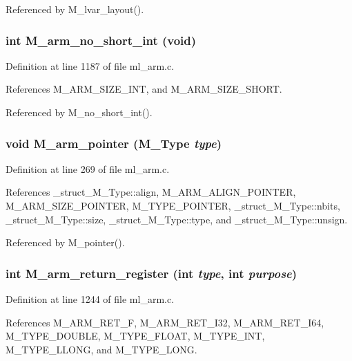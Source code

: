 Referenced by M\_\-lvar\_\-layout().
\subsubsection{\setlength{\rightskip}{0pt plus 5cm}int M\_\-arm\_\-no\_\-short\_\-int (void)}\label{m__arm_8h_3efeafb5f31e16dfb464876bcfbf3706}




Definition at line 1187 of file ml\_\-arm.c.

References M\_\-ARM\_\-SIZE\_\-INT, and M\_\-ARM\_\-SIZE\_\-SHORT.

Referenced by M\_\-no\_\-short\_\-int().
\subsubsection{\setlength{\rightskip}{0pt plus 5cm}void M\_\-arm\_\-pointer (\bf{M\_\-Type} {\em type})}\label{m__arm_8h_b05f019c8111b776ba8cd6557bf1395c}




Definition at line 269 of file ml\_\-arm.c.

References \_\-struct\_\-M\_\-Type::align, M\_\-ARM\_\-ALIGN\_\-POINTER, M\_\-ARM\_\-SIZE\_\-POINTER, M\_\-TYPE\_\-POINTER, \_\-struct\_\-M\_\-Type::nbits, \_\-struct\_\-M\_\-Type::size, \_\-struct\_\-M\_\-Type::type, and \_\-struct\_\-M\_\-Type::unsign.

Referenced by M\_\-pointer().
\subsubsection{\setlength{\rightskip}{0pt plus 5cm}int M\_\-arm\_\-return\_\-register (int {\em type}, int {\em purpose})}\label{m__arm_8h_009ce0a5e4f3153ee2e3acaf637886ea}




Definition at line 1244 of file ml\_\-arm.c.

References M\_\-ARM\_\-RET\_\-F, M\_\-ARM\_\-RET\_\-I32, M\_\-ARM\_\-RET\_\-I64, M\_\-TYPE\_\-DOUBLE, M\_\-TYPE\_\-FLOAT, M\_\-TYPE\_\-INT, M\_\-TYPE\_\-LLONG, and M\_\-TYPE\_\-LONG.

